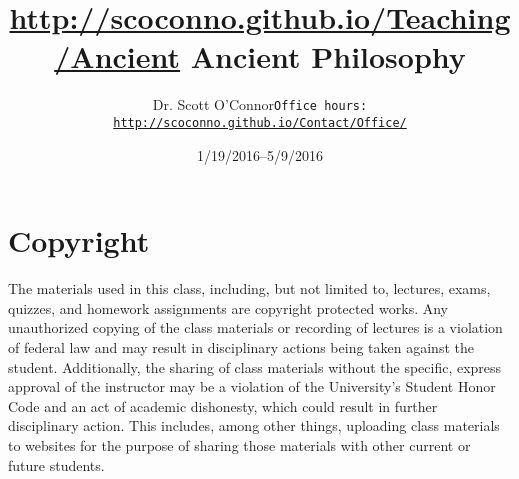 \documentclass[article,oneside]{memoir}
\def\myauthor{Author}
\def\mytitle{Title}
\def\mycopyright{\myauthor}
\def\myweb{\href{http://scoconno.github.io/Teaching/Ancient}{http://scoconno.github.io/Teaching/Ancient}}
\def\myauthor{Dr. Scott O'Connor}
\def\mytitle{{\normalsize \myweb  \newline} \HUGE Ancient Philosophy}
\begin{document}
\setsansfont[Mapping=tex-text]{Myriad Pro} 
\setmonofont[Mapping=tex-text,Scale=0.8]{Minion Pro} 

\def\ind{\hangindent=1 true cm\hangafter=1 \noindent}
\def\labelitemi{$\cdot$}


\title{\LARGE \mytitle}     
\author{\Large\myauthor \newline \footnotesize\texttt{\noindent Office hours: \href{http://scoconno.github.io/Contact/Office/}{http://scoconno.github.io/Contact/Office/}}}
\date{1/19/2016--5/9/2016}



\maketitle




%
%

\section{Copyright}
The materials used in this class, including, but not limited to, lectures, exams, quizzes, and homework assignments are copyright protected works.  Any unauthorized copying of the class materials or recording of lectures is a violation of federal law and may result in disciplinary actions being taken against the student.  Additionally, the sharing of class materials without the specific, express approval of the instructor may be a violation of the University's Student Honor Code and an act of academic dishonesty, which could result in further disciplinary action.  This includes, among other things, uploading class materials to websites for the purpose of sharing those materials with other current or future students. 
\end{document}
